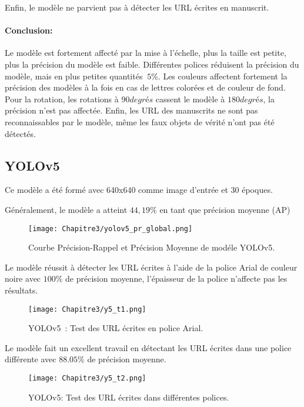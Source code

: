      Enfin, le modèle ne parvient pas à détecter les URL écrites en manuscrit.
     \paragraph{Conclusion:} Le modèle est fortement affecté par la mise à l'échelle, plus la taille est petite, plus la précision du modèle est faible. Différentes polices réduisent la précision du modèle, mais en plus petites quantités $~ 5\%$. Les couleurs affectent fortement la précision des modèles à la fois en cas de lettres colorées et de couleur de fond. Pour la rotation, les rotations à $90 degrés$ cassent le modèle à $180 degrés$, la précision n'est pas affectée. Enfin, les URL des manuscrits ne sont pas reconnaissables par le modèle, même les faux objets de vérité n'ont pas été détectés.
     
     \subsection{YOLOv5}
     Ce modèle a été formé avec 640x640 comme image d'entrée et 30 époques.
     
     Généralement, le modèle a atteint $44,19\%$ en tant que précision moyenne (AP)
     \begin{figure}[H]
               \centering
               \texttt{[image: Chapitre3/yolov5\_pr\_global.png]}
               \caption{Courbe Précision-Rappel et Précision Moyenne de modéle YOLOv5.}
               \label{y4_pr}
               \end{figure}
     
     
     Le modèle réussit à détecter les URL écrites à l'aide de la police Arial de couleur noire avec $100\%$ de précision moyenne, l'épaisseur de la police n'affecte pas les résultats. 
     \begin{figure}[H]
               \centering
               \texttt{[image: Chapitre3/y5\_t1.png]}
               \caption{YOLOv5 : Test des URL écrites en police Arial.}
               \label{y5_t1}
               \end{figure}

     Le modèle fait un excellent travail en détectant les URL écrites dans une police différente avec $88.05\%$ de précision moyenne.
     \begin{figure}[H]
               \centering
               \texttt{[image: Chapitre3/y5\_t2.png]}
               \caption{YOLOv5: Test des URL écrites dans différentes polices.}
               \label{y5_t2}
               \end{figure}


